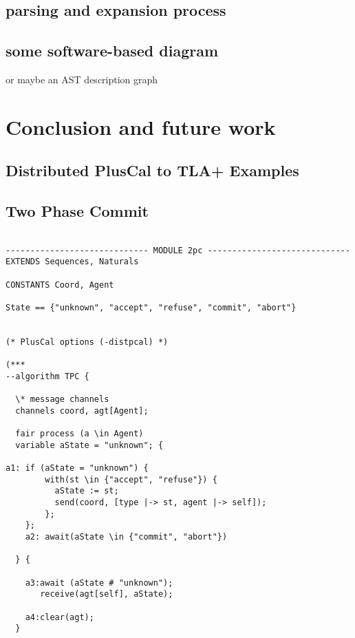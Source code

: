 \documentclass{thesul}
\begin{document}
\section{parsing and expansion process}

\section{some software-based diagram}

or maybe an AST description graph

\chapter{Conclusion and future work}

\begin{appendices}
\chapter{Distributed PlusCal to TLA+ Examples}
\section{Two Phase Commit}
\label{appendix:examples}

\begin{lstlisting}[caption = TLA+ translation for Sub-Processes, frame = tlrb, firstnumber = 1]

----------------------------- MODULE 2pc -----------------------------
EXTENDS Sequences, Naturals

CONSTANTS Coord, Agent

State == {"unknown", "accept", "refuse", "commit", "abort"}

    
(* PlusCal options (-distpcal) *)

(***
--algorithm TPC {
 
  \* message channels
  channels coord, agt[Agent];
     
  fair process (a \in Agent)
  variable aState = "unknown"; {

a1: if (aState = "unknown") {
        with(st \in {"accept", "refuse"}) {
          aState := st;
          send(coord, [type |-> st, agent |-> self]);
        };
    };
    a2: await(aState \in {"commit", "abort"})
    
  } {
    
    a3:await (aState # "unknown");
       receive(agt[self], aState); 
       
    a4:clear(agt);
  }


\end{lstlisting}
\end{appendices}
\end{document}
